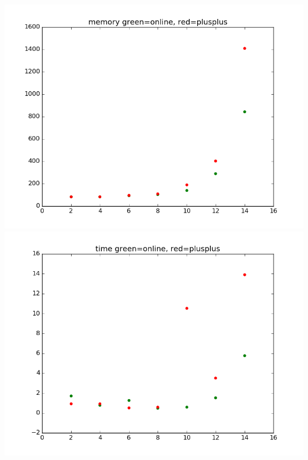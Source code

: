 \documentclass[12pt]{article}
\begin{document}
\begin{table}
\includegraphics[scale=0.4]{memoryComparison.png}
\includegraphics[scale=0.4]{timeComparison.png}
  \end{table}



  
\end{document}
